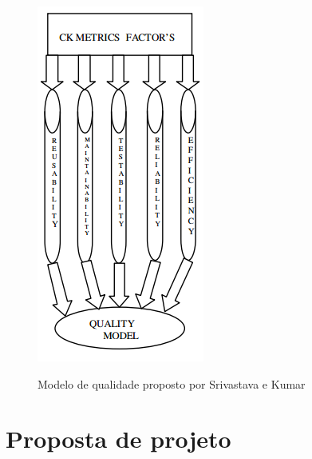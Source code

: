 \documentclass[
	12pt,				%
	oneside,			%
	a4paper,			%
	english,			%
	brazil				%
	]{abntex2ppgsi}
\begin{document}
\begin{figure}[H]%
	\centering
 	  \caption{Modelo de qualidade proposto por Srivastava e Kumar}
		\includegraphics{modelo_srivastava_kumar.png}
	\label{fig:tipos-custo-arvore}
\end{figure}


\chapter{Proposta de projeto}

\postextual



%
%

\end{document}
